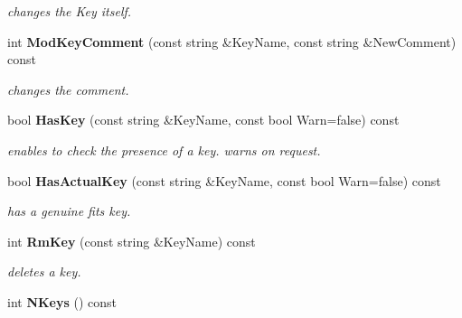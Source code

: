 \begin{CompactItemize}
\begin{CompactList}\small\item\em changes the Key itself.\item\end{CompactList}\item 
{}
int {\bf Mod\-Key\-Comment} (const string \&Key\-Name, const string \&New\-Comment) const\label{class_fitsheader_a24}

\begin{CompactList}\small\item\em changes the comment.\item\end{CompactList}\item 
{}
bool {\bf Has\-Key} (const string \&Key\-Name, const bool Warn=false) const\label{class_fitsheader_a25}

\begin{CompactList}\small\item\em enables to check the presence of a key. warns on request.\item\end{CompactList}\item 
{}
bool {\bf Has\-Actual\-Key} (const string \&Key\-Name, const bool Warn=false) const\label{class_fitsheader_a26}

\begin{CompactList}\small\item\em has a genuine fits key.\item\end{CompactList}\item 
{}
int {\bf Rm\-Key} (const string \&Key\-Name) const\label{class_fitsheader_a27}

\begin{CompactList}\small\item\em deletes a key.\item\end{CompactList}\item 
{}
int {\bf NKeys} () const\label{class_fitsheader_a28}


\end{CompactItemize}
